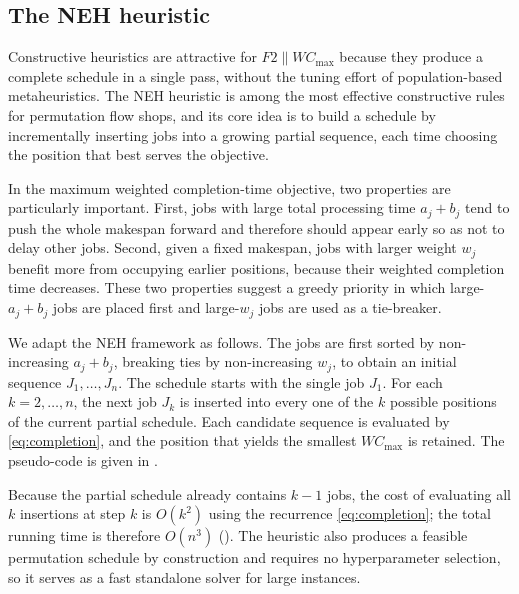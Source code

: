 \documentclass[12pt]{article}
\begin{document}
\begin{sloppypar}
        \subsection{The NEH heuristic}
        Constructive heuristics are attractive for $F2 \parallel W C_{\max}$ because they produce a
        complete schedule in a single pass, without the tuning effort of population-based
        metaheuristics. The NEH heuristic \citep{puka2024} is among the most effective
        constructive rules for permutation flow shops, and its core idea is to build a schedule by
        incrementally inserting jobs into a growing partial sequence, each time choosing the
        position that best serves the objective.
        
        In the maximum weighted completion-time objective, two properties are particularly
        important. First, jobs with large total processing time $a_j+b_j$ tend to push the whole
        makespan forward and therefore should appear early so as not to delay other jobs. Second,
        given a fixed makespan, jobs with larger weight $w_j$ benefit more from occupying earlier
        positions, because their weighted completion time decreases. These two properties suggest a
        greedy priority in which large-$a_j+b_j$ jobs are placed first and large-$w_j$ jobs are used
        as a tie-breaker.
        
        We adapt the NEH framework as follows. The jobs are first sorted by non-increasing
        $a_j+b_j$, breaking ties by non-increasing $w_j$, to obtain an initial sequence
        $J_1,\dots,J_n$. The schedule starts with the single job $J_1$. For each $k=2,\dots,n$, the
        next job $J_k$ is inserted into every one of the $k$ possible positions of the current
        partial schedule. Each candidate sequence is evaluated by \cref{eq:completion}, and the
        position that yields the smallest $W C_{\max}$ is retained. The pseudo-code is given in
        .
        
        Because the partial schedule already contains $k-1$ jobs, the cost of evaluating all $k$
        insertions at step $k$ is $O(k^2)$ using the recurrence \cref{eq:completion}; the total
        running time is therefore $O(n^3)$ (). The heuristic also
        produces a feasible permutation schedule by construction and requires no hyperparameter
        selection, so it serves as a fast standalone solver for large instances.
        

\end{sloppypar}
\end{document}
